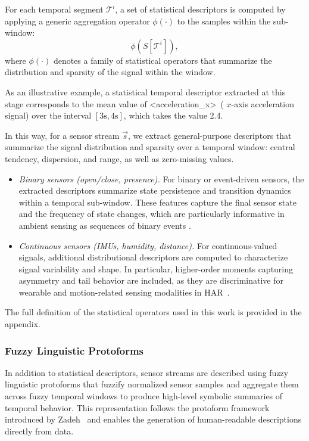 \documentclass[preprint,12pt]{elsarticle}
\begin{document}
For each temporal segment $\mathcal{T}^i$, a set of statistical descriptors is computed by applying a generic aggregation operator $\phi(\cdot)$ to the samples within the sub-window:
\begin{equation}
\label{eq:stat_general}
\phi\!\left(S[\mathcal{T}^i]\right),
\end{equation}
where $\phi(\cdot)$ denotes a family of statistical operators that summarize the distribution and sparsity of the signal within the window.

As an illustrative example, a statistical temporal descriptor extracted at this stage corresponds to the mean value of \textless acceleration\_x\textgreater\ ( $x$-axis acceleration signal) over the interval $[3\text{s},4\text{s}]$, which takes the value 2.4.

In this way, for a sensor stream $\vec{s}$, we extract general-purpose descriptors that summarize the signal distribution and sparsity over a temporal window: central tendency, dispersion, and range, as well as zero-missing values.

\begin{itemize}
    \item \textit{Binary sensors (open/close, presence).}
    For binary or event-driven sensors, the extracted descriptors summarize state persistence and transition dynamics within a temporal sub-window. These features capture the final sensor state and the frequency of state changes, which are particularly informative in ambient sensing as sequences of binary events \cite{ordonez2013activity}.

    \item \textit{Continuous sensors (IMUs, humidity, distance).} For continuous-valued signals, additional distributional descriptors are computed to characterize signal variability and shape. In particular, higher-order moments capturing asymmetry and tail behavior are included, as they are discriminative for wearable and motion-related sensing modalities in HAR~\cite{gomaa2023perspective}.
\end{itemize}

The full definition of the statistical operators used in this work is provided in the appendix.

\subsubsection{Fuzzy Linguistic Protoforms}
\label{sec:fuzzy_logic_representation}
In addition to statistical descriptors, sensor streams are described using fuzzy linguistic protoforms that fuzzify normalized sensor samples and aggregate them across fuzzy temporal windows to produce high-level symbolic summaries of temporal behavior. This representation follows the protoform framework introduced by Zadeh~\cite{zadeh2002prototype} and enables the generation of human-readable descriptions directly from data.
\end{document}
